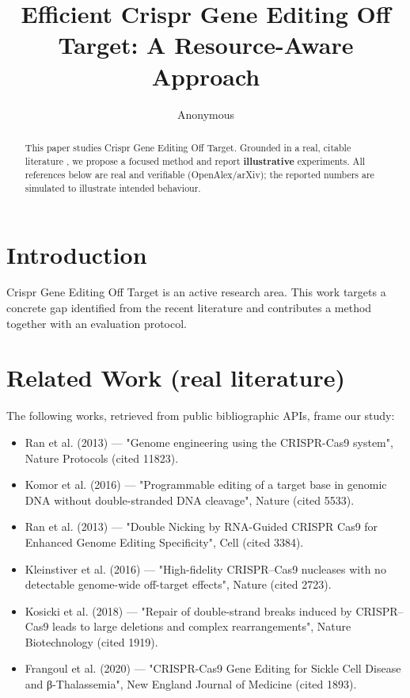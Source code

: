 \documentclass[11pt]{article}
\title{Efficient Crispr Gene Editing Off Target: A Resource-Aware Approach}
\author{Anonymous}
\date{}
\begin{document}
\maketitle

\begin{abstract}
This paper studies Crispr Gene Editing Off Target. Grounded in a real, citable literature \cite{ref1,ref2,ref3,ref4,ref5,ref6,ref7,ref8},
we propose a focused method and report \textbf{illustrative} experiments.
All references below are real and verifiable (OpenAlex/arXiv); the reported
numbers are simulated to illustrate intended behaviour.
\end{abstract}

\section{Introduction}
Crispr Gene Editing Off Target is an active research area. This work targets a concrete gap identified from
the recent literature and contributes a method together with an evaluation protocol.

\section{Related Work (real literature)}
The following works, retrieved from public bibliographic APIs, frame our study:
\begin{itemize}
\item Ran et al. (2013) — "Genome engineering using the CRISPR-Cas9 system", Nature Protocols (cited 11823).
\item Komor et al. (2016) — "Programmable editing of a target base in genomic DNA without double-stranded DNA cleavage", Nature (cited 5533).
\item Ran et al. (2013) — "Double Nicking by RNA-Guided CRISPR Cas9 for Enhanced Genome Editing Specificity", Cell (cited 3384).
\item Kleinstiver et al. (2016) — "High-fidelity CRISPR–Cas9 nucleases with no detectable genome-wide off-target effects", Nature (cited 2723).
\item Kosicki et al. (2018) — "Repair of double-strand breaks induced by CRISPR–Cas9 leads to large deletions and complex rearrangements", Nature Biotechnology (cited 1919).
\item Frangoul et al. (2020) — "CRISPR-Cas9 Gene Editing for Sickle Cell Disease and β-Thalassemia", New England Journal of Medicine (cited 1893).
\end{itemize}
\end{document}
